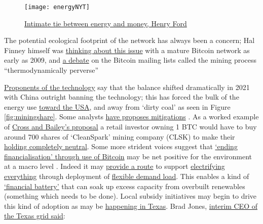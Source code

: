 \begin{figure}
  \centering
    \texttt{[image: energyNYT]}
  \caption{\href{https://www.nytimes.com/1921/12/06/archives/mr-fords-energy-dollar.html}{Intimate tie between energy and money, Henry Ford}}
  \label{fig:energyNYT}
\end{figure}
The potential ecological footprint of the network has always been a concern; Hal Finney himself was \href{https://twitter.com/halfin/status/1153096538}{thinking about this issue} with a mature Bitcoin network as early as 2009, and \href{https://satoshi.nakamotoinstitute.org/posts/bitcointalk/threads/167/#35}{a debate} on the Bitcoin mailing lists called the mining process ``thermodynamically perverse'' \par
\href{https://electricmoney.org/}{Proponents of the technology} say that the balance shifted dramatically in 2021 with China outright banning the technology; this has forced the bulk of the energy use \href{https://docs.google.com/spreadsheets/d/1E7489rM7Q62oXwk1f4NUlMvok9noAbpYfTynY2VTyww/edit#gid=0}{toward the USA}, and away from `dirty coal' as seen in Figure \ref{fig:miningshare}. Some analysts \href{https://docs.google.com/document/d/1N2N-5jY00cmteoY_puWI9oosM1foa4EQqsO1FFfIFR4/edit}{have proposes mitigations} \cite{cross2021greening}. As a worked example of \href{https://docs.google.com/spreadsheets/d/15e_a-D3x4fv3tglEzFmQ6TLQx0fZe6-iKO9Fc9SyISQ/edit#gid=0}{Cross and Bailey's proposal} a retail investor owning 1 BTC would have to buy around 700 shares of `CleanSpark' mining company (CLSK) to make their \href{https://docs.google.com/spreadsheets/d/1r32T8p_PHTP8S781u7PhPSwehLx2VcJTaJJKesMswD0/edit#gid=0}{holding completely neutral}.  Some more strident voices suggest that \href{https://medium.com/@magusperivallon/a-financial-hail-mary-for-the-climate-an-argument-for-bitcoin-adoption-9c58e707d0}{`ending financialisation' through use of Bitcoin} may be net positive for the environment at a macro level \cite{bitcoinisvenice}. Indeed it may \href{https://www.newsweek.com/bitcoin-mining-americas-most-misunderstood-industry-opinion-1669892}{provide a route} to support \href{https://mobile.twitter.com/DSBatten/status/1514072998881665027}{electrifying everything} through deployment of \href{https://lancium.com/solutions/}{flexible demand load}. This enables a kind of \href{https://medium.com/@theendoftheworldpartyparty/deep-bitcarbonization-c8f483716ff7}{`financial battery'} that can soak up excess capacity from overbuilt renewables (something which needs to be done). Local subsidy initiatives may begin to drive this kind of adoption as may be \href{https://braiins.com/blog/bitcoin-mining-the-grid-generators}{happening in Texas}\cite{griffith2021electrify, ercotimpact2021}. Brad Jones, \href{https://www.youtube.com/watch?v=gKnRfDeFgr0}{interim CEO of the Texas grid said}:\par
